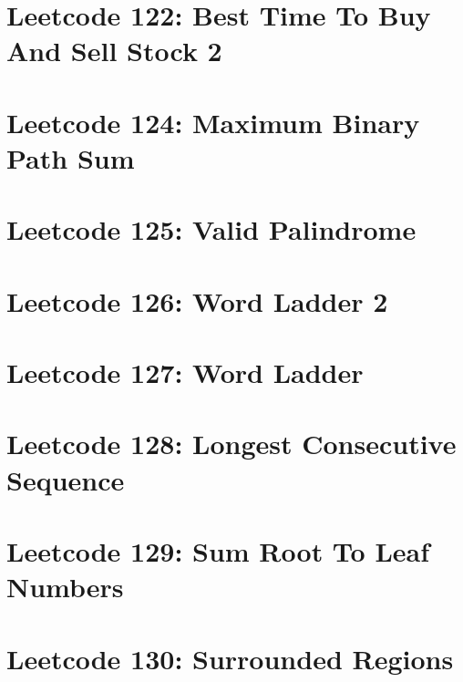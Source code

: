 \documentclass{article}
\begin{document}
\section*{Leetcode 122: Best Time To Buy And Sell Stock 2}

\pagebreak 

\section*{Leetcode 124: Maximum Binary Path Sum}

\pagebreak 

\section*{Leetcode 125: Valid Palindrome}

\pagebreak 

\section*{Leetcode 126: Word Ladder 2}

\pagebreak 

\section*{Leetcode 127: Word Ladder}

\pagebreak 

\section*{Leetcode 128: Longest Consecutive Sequence}

\pagebreak 

\section*{Leetcode 129: Sum Root To Leaf Numbers}

\pagebreak 

\section*{Leetcode 130: Surrounded Regions}

\pagebreak 
\end{document}
